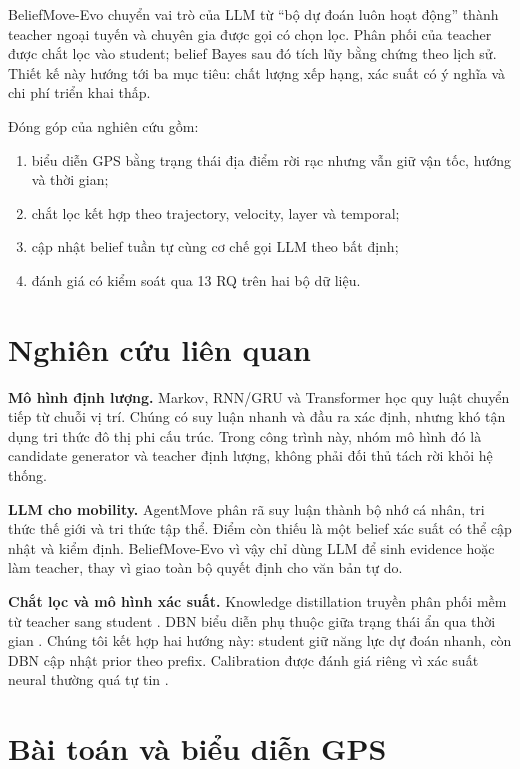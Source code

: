 \documentclass[runningheads]{llncs}
\newcommand{\method}{BeliefMove-Evo}
\begin{document}
\method{} chuyển vai trò của LLM từ ``bộ dự đoán luôn hoạt động'' thành teacher ngoại tuyến và chuyên gia được gọi có chọn lọc. Phân phối của teacher được chắt lọc vào student; belief Bayes sau đó tích lũy bằng chứng theo lịch sử. Thiết kế này hướng tới ba mục tiêu: chất lượng xếp hạng, xác suất có ý nghĩa và chi phí triển khai thấp.

Đóng góp của nghiên cứu gồm:
\begin{enumerate}
 \item biểu diễn GPS bằng trạng thái địa điểm rời rạc nhưng vẫn giữ vận tốc, hướng và thời gian;
 \item chắt lọc kết hợp theo trajectory, velocity, layer và temporal;
 \item cập nhật belief tuần tự cùng cơ chế gọi LLM theo bất định;
 \item đánh giá có kiểm soát qua 13 RQ trên hai bộ dữ liệu.
\end{enumerate}

\section{Nghiên cứu liên quan}

\textbf{Mô hình định lượng.} Markov, RNN/GRU và Transformer học quy luật chuyển tiếp từ chuỗi vị trí. Chúng có suy luận nhanh và đầu ra xác định, nhưng khó tận dụng tri thức đô thị phi cấu trúc. Trong công trình này, nhóm mô hình đó là candidate generator và teacher định lượng, không phải đối thủ tách rời khỏi hệ thống.

\textbf{LLM cho mobility.} AgentMove \cite{feng2025agentmove} phân rã suy luận thành bộ nhớ cá nhân, tri thức thế giới và tri thức tập thể. Điểm còn thiếu là một belief xác suất có thể cập nhật và kiểm định. \method{} vì vậy chỉ dùng LLM để sinh evidence hoặc làm teacher, thay vì giao toàn bộ quyết định cho văn bản tự do.

\textbf{Chắt lọc và mô hình xác suất.} Knowledge distillation truyền phân phối mềm từ teacher sang student \cite{hinton2015distilling}. DBN biểu diễn phụ thuộc giữa trạng thái ẩn qua thời gian \cite{murphy2002dbn}. Chúng tôi kết hợp hai hướng này: student giữ năng lực dự đoán nhanh, còn DBN cập nhật prior theo prefix. Calibration được đánh giá riêng vì xác suất neural thường quá tự tin \cite{guo2017calibration}.

\section{Bài toán và biểu diễn GPS}
\end{document}
